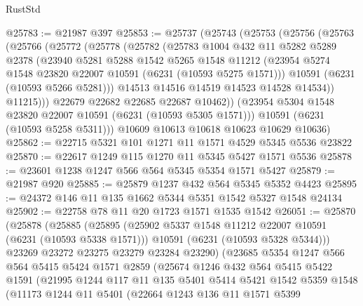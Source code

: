 \begin{lexlean}{RustStd}
\begin{coremodule}
{{@25783 := @21987 @397
@25853 := @25737
    (@25743
      (@25753
        (@25756
          (@25763
            (@25766
              (@25772
                (@25778
                  (@25782
                    (@25783
                      @1004
                      @432
                      @11
                      @5282
                      @5289
                      @2378
                      (@23940
                        @5281
                        @5288
                        @1542
                        @5265
                        @1548
                        @11212
                        (@23954 @5274 @1548 @23820 @22007 @10591 (@6231 (@10593 @5275 @1571)))
                        @10591
                        (@6231 (@10593 @5266 @5281)))
                      @14513
                      @14516
                      @14519
                      @14523
                      @14528
                      @14534))
                  @11215)))
            @22679
            @22682
            @22685
            @22687
            @10462))
        (@23954 @5304 @1548 @23820 @22007 @10591 (@6231 (@10593 @5305 @1571)))
        @10591
        (@6231 (@10593 @5258 @5311)))
      @10609
      @10613
      @10618
      @10623
      @10629
      @10636)
@25862 := @22715 @5321 @101 @1271 @11 @1571 @4529 @5345 @5536 @23822
@25870 := @22617 @1249 @115 @1270 @11 @5345 @5427 @1571 @5536
@25878 := @23601 @1238 @1247 @566 @564 @5345 @5354 @1571 @5427
@25879 := @21987 @920
@25885 := @25879 @1237 @432 @564 @5345 @5352 @4423
@25895 := @24372 @146 @11 @135 @1662 @5344 @5351 @1542 @5327 @1548 @24134
@25902 := @22758 @78 @11 @20 @1723 @1571 @1535 @1542
@26051 := @25870
    (@25878
      (@25885
        (@25895
          (@25902 @5337 @1548 @11212 @22007 @10591 (@6231 (@10593 @5338 @1571)))
          @10591
          (@6231 (@10593 @5328 @5344)))
        @23269
        @23272
        @23275
        @23279
        @23284
        @23290)
      (@23685
        @5354
        @1247
        @566
        @564
        @5415
        @5424
        @1571
        @2859
        (@25674
          @1246
          @432
          @564
          @5415
          @5422
          @1591
          (@21995
            @1244
            @117
            @11
            @135
            @5401
            @5414
            @5421
            @1542
            @5359
            @1548
            (@11173
              @1244
              @11
              @5401
              (@22664
                @1243
                @136
                @11
                @1571
                @5399
}}
\end{coremodule}
\end{lexlean}
